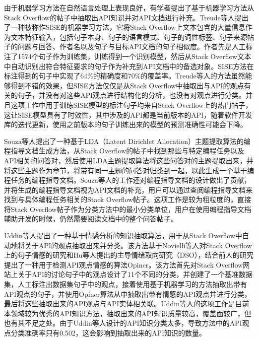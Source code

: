 由于机器学习方法在自然语言处理上表现良好，有学者提出了基于机器学习方法从Stack Overflow的帖子中抽取出API知识并对API文档进行补充。Treude等人\cite{DBLP:conf/icse/TreudeR16}提出了一种被称作SISE的机器学习方法，它将Stack Overflow上文本包含的大量信息作为文本特征输入，包括句子本身、句子的语言模式、句子的词性标签、句子来源帖子的问题与回答、作者名以及句子与目标API文档的句子相似度。作者先是人工标注了1574个句子作为训练集，训练得到一个识别模型，然后从Stack Overflow文本中自动识别出符合特征要求的句子作为补充到API文档中的备选对象。SISE方法在标注得到的句子中实现了64\%的精确度和70\%的覆盖率。Treude等人的方法虽然能够得到不错的效果，但SISE方法仅仅是从Stack Overflow中抽取出与API的观点有关的句子，并没有对这些API观点进行结构化的分析，也没有对观点进行分类。并且这项工作中用于训练SISE模型的标注句子均来自Stack Overflow上的热门帖子，这让SISE模型具有了时效性，其中涉及的API都是当前版本的API，随着软件开发库的迭代更新，使用之前版本的句子训练出来的模型的预测准确性可能会下降。

Souza等人\cite{DBLP:journals/infsof/SouzaCDPRM19}提出了一种基于LDA（Latent Dirichlet Allocation）主题提取算法的编程指导文档生成方法，从Stack Overflow的帖子中找到那些与特定编程任务以及API相关的问答对，然后使用LDA主题提取算法将这些问答对的主题提取出来，并将这些主题作为章节，将带有同一主题的问答对归类到一起，以此生成一个基于编程任务的编程指导文档。Souza等人的工作还对编程指导文档的设计做出了贡献，并将生成的编程指导文档视为API文档的补充，用户可以通过查阅编程指导文档来找到与具体编程任务相关的Stack Overflow帖子。这项工作是较为粗粒度的，直接将Stack Overflow帖子作为分类方法中的最小分类单位，用户在使用编程指导文档辅助开发的时候，仍然需要阅读文档中的整个问答帖子。

Uddin等人\cite{DBLP:journals/tse/UddinK21}提出了一种基于情感分析的知识抽取算法，用于从Stack Overflow中自动地将关于API的观点抽取出来并分类。该方法基于Novielli等人\cite{DBLP:conf/sigsoft/NovielliCL15}对Stack Overflow上的句子情感的研究和Hu等人\cite{DBLP:conf/kdd/HuL04}提出的主导情绪取向研究（DSO），结合前人的研究提出了一种用于检测API观点情感的算法Opiner。该方法首先对Stack Overflow网站上关于API的讨论句子中的观点设计了11个不同的分类，并创建了一个基准数据集，人工标注出数据集句子中的观点，接着使用基于机器学习的方法抽取出带有API观点的句子，并使用Opiner算法从中抽取出带有情感的API观点并进行分类，最后将这些抽取出来的API观点与API实体相关联。Uddin等人的这项工作是目前本领域较为优秀的API知识方法，抽取出来的API知识质量较高，覆盖面较广，但也有其不足之处。由于Uddin等人设计的API知识分类太多，导致方法中的API观点分类准确率只有0.502，这会影响到抽取出来的API知识的数量。

